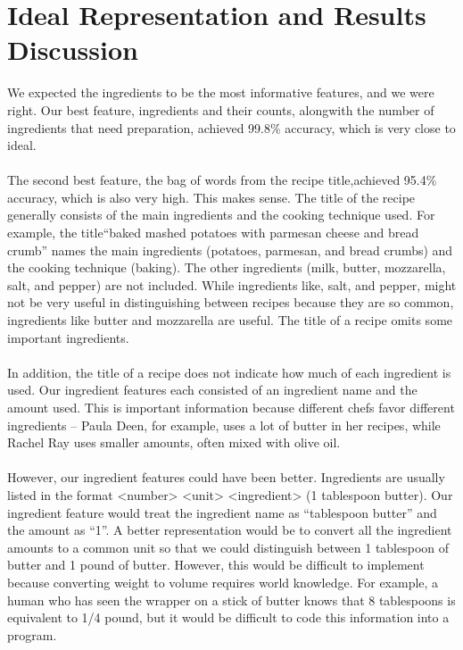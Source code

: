 \documentclass[paper=a4, fontsize=11pt]{scrartcl} %
\begin{document}
\section{Ideal Representation and Results Discussion}

We expected the ingredients to be the most informative features, and we were right.  
Our best feature, ingredients and their counts, alongwith the number of ingredients that need preparation, achieved 99.8\% accuracy, which is very close to ideal. 

\paragraph{}
The second best feature, the bag of words from the recipe title,achieved 95.4\% accuracy, which is also very high. 
This makes sense. 
The title of the recipe generally consists of the main
ingredients and the cooking technique used. 
For example, the title``baked mashed potatoes with parmesan cheese and bread crumb'' names the main ingredients (potatoes, parmesan, and bread crumbs) and the cooking technique (baking). The other ingredients (milk, butter, mozzarella, salt, and pepper) are not included.  While ingredients like, salt, and pepper, might not be very useful in distinguishing between recipes because they are so common, ingredients like butter and mozzarella are useful. The title of a recipe omits some important ingredients.

\paragraph{}
In addition, the title of a recipe does not indicate how much of each ingredient is used. 
Our ingredient features each consisted of an ingredient name and the amount used. This is important information because different chefs favor different ingredients -- Paula Deen, for example, uses a lot of butter in her recipes, while Rachel Ray uses smaller amounts, often mixed with olive oil.

\paragraph{}
However, our ingredient features could have been better. Ingredients are usually listed in the format  <number> <unit> <ingredient> (1 tablespoon butter). Our ingredient feature would treat the ingredient name as ``tablespoon butter'' and the amount as ``1''. 
A better representation would be to convert all the ingredient amounts to a common unit so that we could distinguish between 1 tablespoon of butter and 1 pound of butter. 
However, this would be difficult to implement because converting weight to volume requires world
knowledge.  
For example, a human who has seen the wrapper on a stick of butter knows that 8 tablespoons is equivalent to 1/4 pound, but it would be difficult to code this information into a program. 
\end{document}
